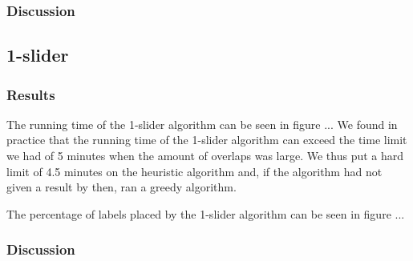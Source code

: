 \documentclass[crop=false,a4paper,oneside,11pt]{standalone}
\begin{document}
\subsubsection{Discussion}

\subsection{1-slider}
\subsubsection{Results}
The running time of the 1-slider algorithm can be seen in figure ... We found in practice that the running time of the 1-slider algorithm can exceed the time limit we had of 5 minutes when the amount of overlaps was large. We thus put a hard limit of 4.5 minutes on the heuristic algorithm and, if the algorithm had not given a result by then, ran a greedy algorithm.

The percentage of labels placed by the 1-slider algorithm can be seen in figure ...
\subsubsection{Discussion}
\end{document}
